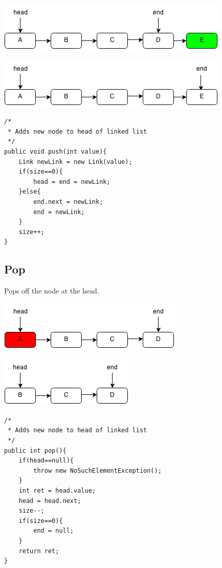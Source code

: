 \documentclass[11pt,oneside]{book}
\makeatletter
\def\maxwidth#1{\ifdim\Gin@nat@width>#1 #1\else\Gin@nat@width\fi}
\makeatother
\begin{document}
\includegraphics[width=\maxwidth{\textwidth}]{linkedlistpush2.png}

\includegraphics[width=\maxwidth{\textwidth}]{linkedlistpush3.png}

\begin{lstlisting}
/*
 * Adds new node to head of linked list
 */
public void push(int value){
    Link newLink = new Link(value);
    if(size==0){
        head = end = newLink;
    }else{
        end.next = newLink;
        end = newLink;
    }
    size++;
}
\end{lstlisting}

\subsection{Pop}

Pops off the node at the head.

\includegraphics[width=\maxwidth{\textwidth}]{linkedlistpop.png}

\includegraphics[width=\maxwidth{\textwidth}]{linkedlistpop2.png}

\begin{lstlisting}
/*
 * Adds new node to head of linked list
 */
public int pop(){
    if(head==null){
        throw new NoSuchElementException();
    }
    int ret = head.value;
    head = head.next;
    size--;
    if(size==0){
        end = null;
    }
    return ret;
}
\end{lstlisting}
\end{document}
